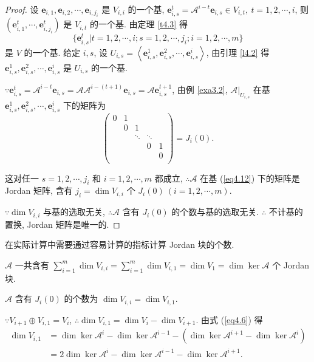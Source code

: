 \documentclass[color=black,device=normal,lang=cn,mode=geye]{elegantnote}
\begin{document}
\begin{proof}
    设 $\boldsymbol{e}_{i,1},\boldsymbol{e}_{i,2},\cdots,\boldsymbol{e}_{i,j_i}$ 是 $V_{i,i}$ 的一个基, $\boldsymbol{e}_{i,s}^t=\mathcal{A}^{i-t}\boldsymbol{e}_{i,s}\in V_{i,t},\ t=1,2,\cdots,i$, 则 $(\boldsymbol{e}_{i,1}^t,\cdots,\boldsymbol{e}_{i,j_i}^t)$ 是 $V_{i,t}$ 的一个基. 由定理 \ref{t4.3} 得
    \begin{equation}\label{eq4.12}
        \{\boldsymbol{e}_{i,s}^t|t=1,2,\cdots,i;s=1,2,\cdots,j_i;i=1,2,\cdots,m\}
    \end{equation}
    是 $V$ 的一个基. 给定 $i,s$, 设 $U_{i,s}=\left<\boldsymbol{e}_{i,s}^1,\boldsymbol{e}_{i,s}^2,\cdots,\boldsymbol{e}_{i,s}^i\right>$, 由引理 \ref{l4.2} 得 $\boldsymbol{e}_{i,s}^1,\boldsymbol{e}_{i,s}^2,\cdots,\boldsymbol{e}_{i,s}^i$ 是 $U_{i,s}$ 的一个基.
    
    $\because\boldsymbol{e}_{i,s}^t=\mathcal{A}^{i-t}\boldsymbol{e}_{i,s}=\mathcal{A}\mathcal{A}^{i-(t+1)}\boldsymbol{e}_{i,s}=\mathcal{A}\boldsymbol{e}_{i,s}^{t+1}$, 由例 \ref{exa3.2}, $\mathcal{A}|_{U_{i,s}}$ 在基 $\boldsymbol{e}_{i,s}^1,\boldsymbol{e}_{i,s}^2,\cdots,\boldsymbol{e}_{i,s}^i$ 下的矩阵为
    \[\begin{pmatrix}
        0 & 1 \\
        & 0 & 1 \\
        && \ddots & \ddots \\
        &&& 0 & 1 \\
        &&&& 0 \\
    \end{pmatrix}=J_i(0).\]

    这对任一 $s=1,2,\cdots,j_i$ 和 $i=1,2,\cdots,m$ 都成立, $\therefore\mathcal{A}$ 在基 (\ref{eq4.12}) 下的矩阵是 Jordan 矩阵, 含有 $j_i=\dim V_{i,i}$ 个 $J_i(0)\ (i=1,2,\cdots,m)$.

    $\because\dim V_{i,i}$ 与基的选取无关, $\therefore\mathcal{A}$ 含有 $J_i(0)$ 的个数与基的选取无关. $\therefore$ 不计基的置换, Jordan 矩阵是唯一的.
\end{proof}
\begin{note}
    在实际计算中需要通过容易计算的指标计算 Jordan 块的个数.

    $\mathcal{A}$ 一共含有 $\sum\limits_{i=1}^m\dim V_{i,i}=\sum\limits_{i=1}^m\dim V_{i,1}=\dim V_1=\dim\ker\mathcal{A}$ 个 Jordan 块.

    $\mathcal{A}$ 含有 $J_i(0)$ 的个数为 $\dim V_{i,i}=\dim V_{i,1}$.
    
    $\because V_{i+1}\oplus V_{i,1}=V_i$, $\therefore\dim V_{i,1}=\dim V_i-\dim V_{i+1}$. 由式 (\ref{eq4.6}) 得
    \begin{align*}
        \dim V_{i,1} & =\dim\ker\mathcal{A}^i-\dim\ker\mathcal{A}^{i-1}-(\dim\ker\mathcal{A}^{i+1}-\dim\ker\mathcal{A}^i) \\
        & =2\dim\ker\mathcal{A}^i-\dim\ker\mathcal{A}^{i-1}-\dim\ker\mathcal{A}^{i+1}.
    \end{align*}
\end{note}
\end{document}
